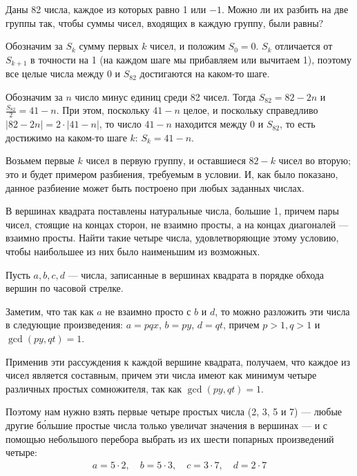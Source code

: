 ﻿


\begin{itemize}
\itA Даны 82 числа, каждое из которых равно 1 или $-1$. Можно ли их разбить на две группы так, 
чтобы суммы чисел, входящих в каждую группу, были равны?

\itr Обозначим за $S_k$ сумму первых $k$ чисел, и положим $S_0 = 0$. 
$S_k$ отличается от $S_{k+1}$ в точности на 1 (на каждом шаге мы прибавляем или 
вычитаем 1), поэтому все целые числа между $0$ и $S_{82}$ достигаются на каком-то шаге.

Обозначим за $n$ число минус единиц среди 82 чисел. Тогда $S_{82} = 82-2n$
и $\frac{S_{82}}{2} = 41-n$. При этом, поскольку $41-n$ целое, и поскольку справедливо 
$|82-2n|=2\cdot|41-n|$, то число $41-n$ находится между 0 и $S_{82}$, то есть 
достижимо на каком-то шаге $k$: $S_k = 41-n$.

Возьмем первые $k$ чисел в первую группу, и оставшиеся $82-k$ чисел во вторую;  это и будет
примером разбиения, требуемым в условии. И, как было показано, данное разбиение может быть 
построено при любых заданных числах.
\end{itemize}


\begin{itemize}
\itC В вершинах квадрата поставлены натуральные числа, большие 1, причем пары чисел, 
стоящие на концах сторон, не взаимно просты, а на концах диагоналей --- взаимно просты. 
Найти такие четыре числа, удовлетворяющие этому условию,
чтобы наибольшее из них было наименьшим из возможных.

\itr 
Пусть $a,b,c,d$ --- числа, записанные в вершинах квадрата в порядке обхода вершин по часовой стрелке. 

\begin{center}
\end{center}

Заметим, что так как $a$ не взаимно просто с $b$ и $d$, то можно разложить эти числа в 
следующие произведения:
$a = pqx$, $b = py$, $d = qt$, причем $p>1, q>1$ и $\gcd(py,qt)=1$. 

Применив эти рассуждения к каждой вершине квадрата, получаем, что каждое из чисел является
составным, причем эти числа имеют как минимум четыре различных простых сомножителя, 
так как $\gcd(py,qt)=1$. 

Поэтому нам нужно взять первые четыре простых числа (2, 3, 5 и 7) --- любые другие б\'ольшие простые числа
только увеличат значения в вершинах --- и с помощью небольшого перебора
выбрать из их шести попарных произведений четыре:
$$
\begin{array}{l}
a=5 \cdot 2,\quad
b=5 \cdot 3,\quad
c=3 \cdot 7,\quad
d=2 \cdot 7
\end{array}
$$
\end{itemize}

